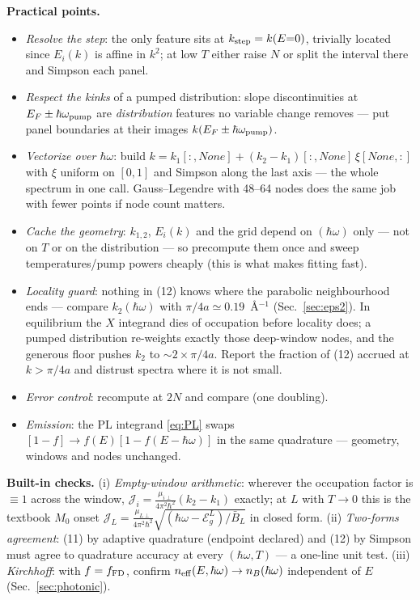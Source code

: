 \documentclass[11pt,a4paper]{article}
\numberwithin{equation}{section}
\begin{document}
\vspace{1em}
\textbf{Practical points.}
\begin{itemize}
\item \emph{Resolve the step}: the only feature sits at $k_{\rm step}=k(E{=}0)$, trivially located since $E_i(k)$ is affine in $k^2$; at low $T$ either raise $N$ or split the interval there and Simpson each panel.
\item \emph{Respect the kinks} of a pumped distribution: slope discontinuities at $E_F\pm\hbar\omega_{\rm pump}$ are \emph{distribution} features no variable change removes --- put panel boundaries at their images $k(E_F\pm\hbar\omega_{\rm pump})$.
\item \emph{Vectorize over ${\hbar\omega}$}: build $k=k_1[:,\!None]+(k_2-k_1)[:,\!None]\,\xi[None,:]$ with $\xi$ uniform on $[0,1]$ and Simpson along the last axis --- the whole spectrum in one call.  Gauss--Legendre with 48--64 nodes does the same job with fewer points if node count matters.
\item \emph{Cache the geometry}: $k_{1,2}$, $E_i(k)$ and the grid depend on $({\hbar\omega})$ only --- not on $T$ or on the distribution --- so precompute them once and sweep temperatures/pump powers cheaply (this is what makes fitting fast).
\item \emph{Locality guard}: nothing in (12) knows where the parabolic neighbourhood ends --- compare $k_2({\hbar\omega})$ with $\pi/4a\simeq0.19$~\AA$^{-1}$ (Sec.~\ref{sec:eps2}).  In equilibrium the $X$ integrand dies of occupation before locality does; a pumped distribution re-weights exactly those deep-window nodes, and the generous floor pushes $k_2$ to ${\sim}2\times\pi/4a$.  Report the fraction of (12) accrued at $k>\pi/4a$ and distrust spectra where it is not small.
\item \emph{Error control}: recompute at $2N$ and compare (one doubling).
\item \emph{Emission}: the PL integrand \eqref{eq:PL} swaps $[1-{f}]\to {f}(E)[1-{f}(E-{\hbar\omega})]$ in the same quadrature --- geometry, windows and nodes unchanged.
\end{itemize}

\textbf{Built-in checks.}
(i) \emph{Empty-window arithmetic}: wherever the occupation factor is
$\equiv1$ across the window,
${\mathcal{J}}_i=\frac{\mu_{i\perp}}{4\pi^2\hbar^2}(k_2-k_1)$ exactly; at $L$
with $T\to0$ this is the textbook $M_0$ onset
${\mathcal{J}}_L=\frac{\mu_{L\perp}}{4\pi^2\hbar^2}
\sqrt{({\hbar\omega}-{\mathcal{E}_g^{L}})/{\bar{B}}_L}$ in closed form.
(ii) \emph{Two-forms agreement}: (11) by adaptive quadrature (endpoint
declared) and (12) by Simpson must agree to quadrature accuracy at
every $({\hbar\omega},T)$ --- a one-line unit test.
(iii) \emph{Kirchhoff}: with ${f}={f}_{\rm FD}$, confirm
$n_{\rm eff}(E,{\hbar\omega})\to n_B({\hbar\omega})$ independent of $E$
(Sec.~\ref{sec:photonic}).
\end{document}
